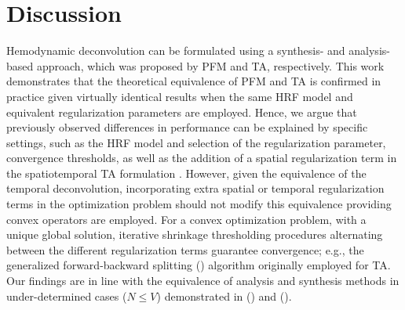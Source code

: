 
\section{Discussion}

Hemodynamic deconvolution can be formulated using a synthesis- and analysis-based approach, which was proposed by PFM and TA, respectively. This work demonstrates that the theoretical equivalence of PFM and TA is confirmed in practice given virtually identical results when the same HRF model and equivalent regularization parameters are employed. Hence, we argue that previously observed differences in performance can be explained by specific settings, such as the HRF model and selection of the regularization parameter, convergence thresholds, as well as the addition of a spatial regularization term in the spatiotemporal TA formulation \citealt{Karahanoglu2013TotalactivationfMRI}. However, given the equivalence of the temporal deconvolution, incorporating extra spatial or temporal regularization terms in the optimization problem should not modify this equivalence providing convex operators are employed. For a convex optimization problem, with a unique global solution, iterative shrinkage thresholding procedures alternating between the different regularization terms guarantee convergence; e.g., the generalized forward-backward splitting (\citealt{Raguet2013GeneralizedForwardBackward}) algorithm originally employed for TA. Our findings are in line with the equivalence of analysis and synthesis methods in under-determined cases (\(N \leq V\)) demonstrated in (\citealt{Elad2007Analysisversussynthesis}) and (\citealt{ortelli2019synthesis}).

